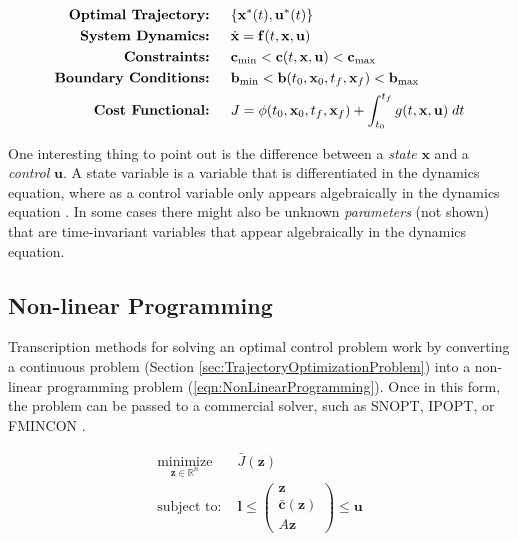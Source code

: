 \begin{align}

\text{\bf Optimal Trajectory: }& \quad
\{ \mathbf{x}^*(t), \mathbf{u}^*(t) \}
\label{eqn:optimalTrajectory}\\

\text{\bf System Dynamics: }& \quad
\dot{\mathbf{x}} = \mathbf{f}(t,\mathbf{x},\mathbf{u})
\label{eqn:systemDynamics}\\

\text{\bf Constraints: }& \quad
\mathbf{c}_{\text{min}} < \mathbf{c}(t,\mathbf{x},\mathbf{u}) < \mathbf{c}_{\text{max}}
\label{eqn:constraints}\\

\text{\bf Boundary Conditions: }& \quad
\mathbf{b}_{\text{min}} < \mathbf{b}(t_0,\mathbf{x}_0,t_f,\mathbf{x}_f) < \mathbf{b}_{\text{max}}
\label{eqn:boundaryConditions}\\

\text{\bf Cost Functional: }& \quad
J = \phi(t_0,\mathbf{x}_0,t_f,\mathbf{x}_f) + \int_{t_0}^{t_f} g(t,\mathbf{x},\mathbf{u}) \; dt
\label{eqn:costFunctional}

\end{align}

One interesting thing to point out is the difference between a {\em state} $\mathbf{x}$ and a {\em control} $\mathbf{u}$. A state variable is a variable that is differentiated in the dynamics equation, where as a control variable only appears algebraically in the dynamics equation \cite{Betts2010}. In some cases there might also be unknown {\em parameters} (not shown) that are time-invariant variables that appear algebraically in the dynamics equation.


\subsection{Non-linear Programming}

Transcription methods for solving an optimal control problem work by converting a continuous problem (Section \ref{sec:TrajectoryOptimizationProblem}) into a non-linear programming problem (\ref{eqn:NonLinearProgramming}). Once in this form, the problem can be passed to a commercial solver, such as SNOPT\cite{Gill2005}, IPOPT\cite{Wachter2006}, or FMINCON \cite{MatlabOptimizationToolbox2014}.

\begin{align}
	\underset{\mathbf{z} \in \mathbb{R}^n}{\text{minimize}}  \quad  & \bar{J}(\mathbf{z}) \\
	\text{subject to: }  & \mathbf{l} \leq \left( 
			\begin{array}{c}
			\mathbf{z} \\
			\mathbf{\bar{c}}(\mathbf{z}) \\
			A \mathbf{z}
			\end{array}
			\right) \leq \mathbf{u}
			\label{eqn:NonLinearProgramming}	
\end{align}

